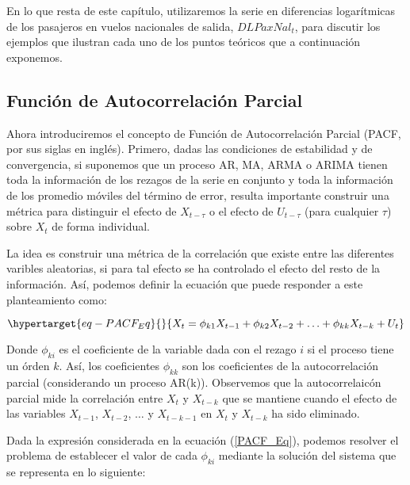 \documentclass[
  a4paper,
]{article}
\begin{document}
En lo que resta de este capítulo, utilizaremos la serie en diferencias
logarítmicas de los pasajeros en vuelos nacionales de salida,
\(DLPaxNal_t\), para discutir los ejemplos que ilustran cada uno de los
puntos teóricos que a continuación exponemos.

\hypertarget{funciuxf3n-de-autocorrelaciuxf3n-parcial}{%
\subsection{Función de Autocorrelación
Parcial}\label{funciuxf3n-de-autocorrelaciuxf3n-parcial}}

Ahora introduciremos el concepto de Función de Autocorrelación Parcial
(PACF, por sus siglas en inglés). Primero, dadas las condiciones de
estabilidad y de convergencia, si suponemos que un proceso AR, MA, ARMA
o ARIMA tienen toda la información de los rezagos de la serie en
conjunto y toda la información de los promedio móviles del término de
error, resulta importante construir una métrica para distinguir el
efecto de \(X_{t - \tau}\) o el efecto de \(U_{t - \tau}\) (para
cualquier \(\tau\)) sobre \(X_t\) de forma individual.

La idea es construir una métrica de la correlación que existe entre las
diferentes varibles aleatorias, si para tal efecto se ha controlado el
efecto del resto de la información. Así, podemos definir la ecuación que
puede responder a este planteamiento como:

\begin{equation}\protect\hypertarget{eq-PACF_Eq}{}{
X_t = \phi_{k1} X_{t-1} + \phi_{k2} X_{t-2} + \ldots + \phi_{kk} X_{t-k} + U_t
}\label{eq-PACF_Eq}\end{equation}

Donde \(\phi_{ki}\) es el coeficiente de la variable dada con el rezago
\(i\) si el proceso tiene un órden \(k\). Así, los coeficientes
\(\phi_{kk}\) son los coeficientes de la autocorrelación parcial
(considerando un proceso AR(k)). Observemos que la autocorrelaicón
parcial mide la correlación entre \(X_t\) y \(X_{t-k}\) que se mantiene
cuando el efecto de las variables \(X_{t-1}\), \(X_{t-2}\), \(\ldots\) y
\(X_{t-k-1}\) en \(X_{t}\) y \(X_{t-k}\) ha sido eliminado.

Dada la expresión considerada en la ecuación (\ref{PACF_Eq}), podemos
resolver el problema de establecer el valor de cada \(\phi_{ki}\)
mediante la solución del sistema que se representa en lo siguiente:
\end{document}
